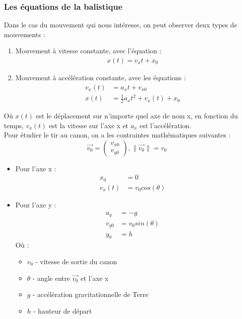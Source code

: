 \documentclass[12pt,a4paper]{article}
\begin{document}
    \subsubsection{Les équations de la balistique}
    Dans le cas du mouvement qui nous intéresse, on peut observer deux types de mouvements :
    \begin{enumerate}
        \item Mouvement à vitesse constante, avec l'équation :
        \begin{align*}
            x(t) = v_xt + x_0
        \end{align*}
        \item Mouvement à accélération constante, avec les équations :
        \begin{align*}
            v_x(t) &= a_xt + v_{x0} \\
            x(t) &= \frac{1}{2}a_xt^2 + v_x(t) + x_0
        \end{align*}
    \end{enumerate}
    Où $x(t)$ est le déplacement sur n'importe quel axe de nom x, en fonction du temps, $v_x(t)$ est la vitesse sur l'axe x et $a_x$ est l'accélération. \\
    Pour étudier le tir au canon, on a les contraintes mathématiques suivantes :
    \begin{equation*}
        \vec{v_0}=
        \begin{pmatrix}
            v_{x0} \\
            v_{y0}
        \end{pmatrix}, 
        \|\vec{v_0}\|=v_0
    \end{equation*}
    \begin{itemize}
        \item Pour l'axe x :
        \begin{align*}
            x_0 &= 0 \\
            v_x(t)&=v_0cos(\theta)
        \end{align*}
        \item Pour l'axe y :
        \begin{align*}
            a_y &= -g \\
            v_{y0} &= v_0sin(\theta) \\
            y_0 &= h
        \end{align*}
        Où :
        \begin{itemize}
            \item $v_0$ - vitesse de sortie du canon
            \item $\theta$ - angle entre $\vec{v_0}$ et l'axe x
            \item $g$ - accélération gravitationnelle de Terre
            \item $h$ - hauteur de départ
        \end{itemize}
    \end{itemize}
\end{document}

